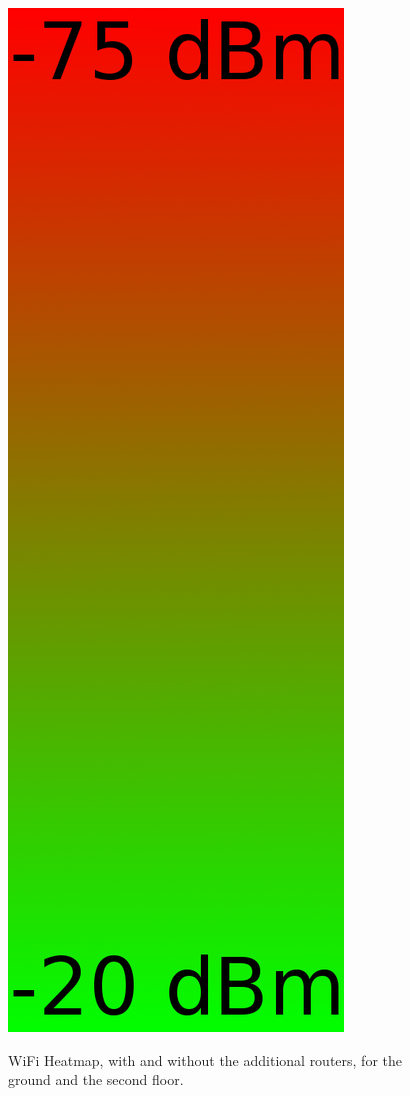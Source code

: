 \documentclass[10pt]{sensys-proc}
\begin{document}
\begin{figure}[t!]
{                         \includegraphics[scale=0.0275]{./figures/heatmap.png}}
              \vspace{-3mm}
    \caption{WiFi Heatmap, with and without the additional routers, for the ground and the second floor.}
\end{figure}
\end{document}
